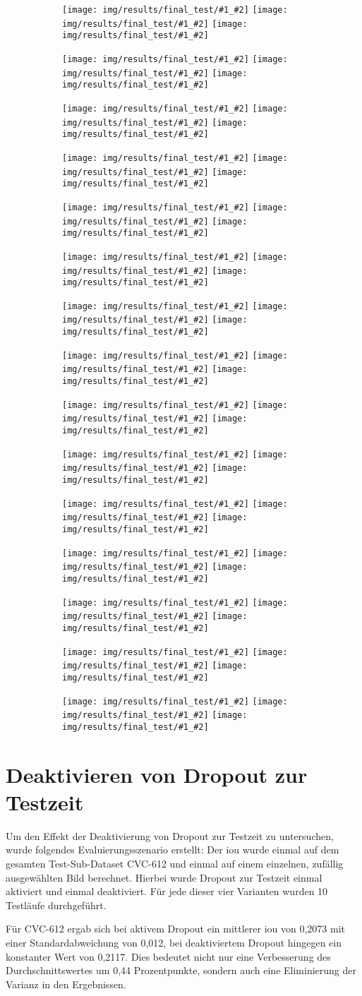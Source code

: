 \newcommand{\figureOutput}[2]{\texttt{[image: img/results/final\_test/\#1\_\#2]}}
\newcommand{\figureSample}[1]{
	\begin{subfigure}{\linewidth}
		\centering
		\figureOutput{#1}{input}
		\figureOutput{#1}{target}
		\figureOutput{#1}{output}
		\vspace*{2mm}
	\end{subfigure}
}
\begin{sidewaysfigure}
	\centering
	\begin{subfigure}{.31\textwidth}
		\centering
		\figureSample{117}
		\figureSample{128}
		\figureSample{139}
		\figureSample{150}
		\figureSample{161}
	\end{subfigure}
	\begin{subfigure}{.31\textwidth}
		\centering
		\figureSample{118}
		\figureSample{129}
		\figureSample{140}
		\figureSample{151}
		\figureSample{162}
	\end{subfigure}
	\begin{subfigure}{.31\textwidth}
		\centering
		\figureSample{119}
		\figureSample{130}
		\figureSample{141}
		\figureSample{152}
		\figureSample{163}
	\end{subfigure}
	\caption{Beispielhafte Datensätze der Testdaten und Ausgaben des finalen Modells (Input, Target, Output)}
	\label{fig:outputsfinal}
\end{sidewaysfigure}



\section{Deaktivieren von Dropout zur Testzeit}

Um den Effekt der Deaktivierung von Dropout zur Testzeit zu untersuchen, wurde folgendes Evaluierungsszenario erstellt:
Der \gls{iou} wurde einmal auf dem gesamten Test-Sub-Dataset CVC-612 und einmal auf einem einzelnen, zufällig ausgewählten Bild berechnet.
Hierbei wurde Dropout zur Testzeit einmal aktiviert und einmal deaktiviert.
Für jede dieser vier Varianten wurden 10 Testläufe durchgeführt.

Für CVC-612 ergab sich bei aktivem Dropout ein mittlerer \gls{iou} von 0,2073 mit einer Standardabweichung von 0,012, bei deaktiviertem Dropout hingegen ein konstanter Wert von 0,2117.
Dies bedeutet nicht nur eine Verbesserung des Durchschnittswertes um 0,44 Prozentpunkte, sondern auch eine Eliminierung der Varianz in den Ergebnissen.

